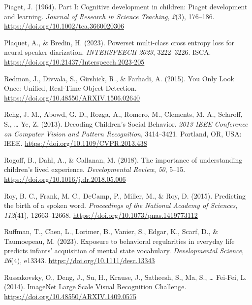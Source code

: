 \documentclass[
  man,floatsintext]{apa6}
\newlength{\cslhangindent}
\newenvironment{CSLReferences}[2] %
 {\begin{list}{}{%
  \setlength{\itemindent}{0pt}
  \setlength{\leftmargin}{0pt}
  \setlength{\parsep}{0pt}
  \ifodd #1
   \setlength{\leftmargin}{\cslhangindent}
   \setlength{\itemindent}{-1\cslhangindent}
  \fi
  \setlength{\itemsep}{#2\baselineskip}}}
 {\end{list}}
\begin{document}
\begin{CSLReferences}{1}{0}
Piaget, J. (1964). Part {I}: {Cognitive} development in children: {Piaget} development and learning. \emph{Journal of Research in Science Teaching}, \emph{2}(3), 176--186. \url{https://doi.org/10.1002/tea.3660020306}

Plaquet, A., \& Bredin, H. (2023). Powerset multi-class cross entropy loss for neural speaker diarization. \emph{{INTERSPEECH} 2023}, 3222--3226. ISCA. \url{https://doi.org/10.21437/Interspeech.2023-205}

Redmon, J., Divvala, S., Girshick, R., \& Farhadi, A. (2015). You {Only Look Once}: {Unified}, {Real-Time Object Detection}. \url{https://doi.org/10.48550/ARXIV.1506.02640}

Rehg, J. M., Abowd, G. D., Rozga, A., Romero, M., Clements, M. A., Sclaroff, S., \ldots{} Ye, Z. (2013). Decoding {Children}'s {Social Behavior}. \emph{2013 {IEEE Conference} on {Computer Vision} and {Pattern Recognition}}, 3414--3421. Portland, OR, USA: IEEE. \url{https://doi.org/10.1109/CVPR.2013.438}

Rogoff, B., Dahl, A., \& Callanan, M. (2018). The importance of understanding children's lived experience. \emph{Developmental Review}, \emph{50}, 5--15. \url{https://doi.org/10.1016/j.dr.2018.05.006}

Roy, B. C., Frank, M. C., DeCamp, P., Miller, M., \& Roy, D. (2015). Predicting the birth of a spoken word. \emph{Proceedings of the National Academy of Sciences}, \emph{112}(41), 12663--12668. \url{https://doi.org/10.1073/pnas.1419773112}

Ruffman, T., Chen, L., Lorimer, B., Vanier, S., Edgar, K., Scarf, D., \& Taumoepeau, M. (2023). Exposure to behavioral regularities in everyday life predicts infants' acquisition of mental state vocabulary. \emph{Developmental Science}, \emph{26}(4), e13343. \url{https://doi.org/10.1111/desc.13343}

Russakovsky, O., Deng, J., Su, H., Krause, J., Satheesh, S., Ma, S., \ldots{} Fei-Fei, L. (2014). {ImageNet Large Scale Visual Recognition Challenge}. \url{https://doi.org/10.48550/ARXIV.1409.0575}


\end{CSLReferences}
\end{document}
